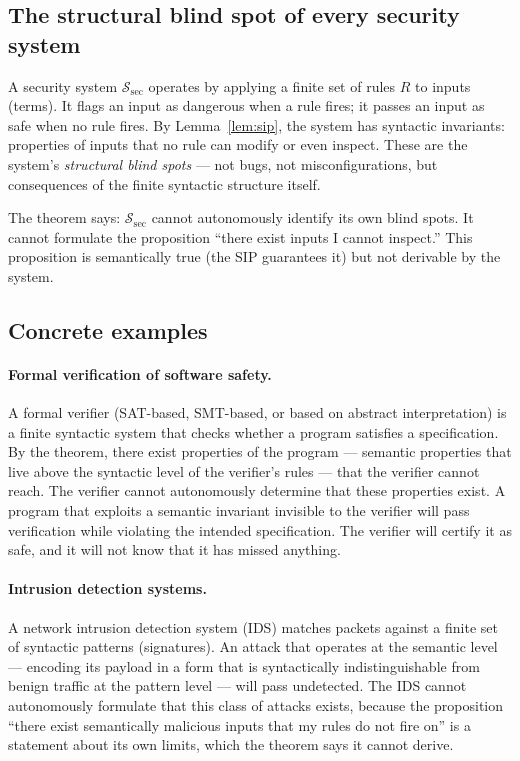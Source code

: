 \documentclass[11pt]{article}
\begin{document}
\subsection{The structural blind spot of every security system}

A security system $\mathcal{S}_{\mathrm{sec}}$ operates by applying a
finite set of rules $R$ to inputs (terms). It flags an input as
dangerous when a rule fires; it passes an input as safe when no rule
fires. By Lemma~\ref{lem:sip}, the system has syntactic invariants:
properties of inputs that no rule can modify or even inspect. These are
the system's \emph{structural blind spots} --- not bugs, not
misconfigurations, but consequences of the finite syntactic structure
itself.

The theorem says: $\mathcal{S}_{\mathrm{sec}}$ cannot autonomously
identify its own blind spots. It cannot formulate the proposition
``there exist inputs I cannot inspect.'' This proposition is
semantically true (the SIP guarantees it) but not derivable by the
system.

\subsection{Concrete examples}

\paragraph{Formal verification of software safety.}
A formal verifier (SAT-based, SMT-based, or based on abstract
interpretation) is a finite syntactic system that checks whether a
program satisfies a specification. By the theorem, there exist
properties of the program --- semantic properties that live above the
syntactic level of the verifier's rules --- that the verifier cannot
reach. The verifier cannot autonomously determine that these properties
exist. A program that exploits a semantic invariant invisible to the
verifier will pass verification while violating the intended
specification. The verifier will certify it as safe, and it will not
know that it has missed anything.

\paragraph{Intrusion detection systems.}
A network intrusion detection system (IDS) matches packets against a
finite set of syntactic patterns (signatures). An attack that operates
at the semantic level --- encoding its payload in a form that is
syntactically indistinguishable from benign traffic at the pattern level
--- will pass undetected. The IDS cannot autonomously formulate that
this class of attacks exists, because the proposition ``there exist
semantically malicious inputs that my rules do not fire on'' is a
statement about its own limits, which the theorem says it cannot
derive.
\end{document}
